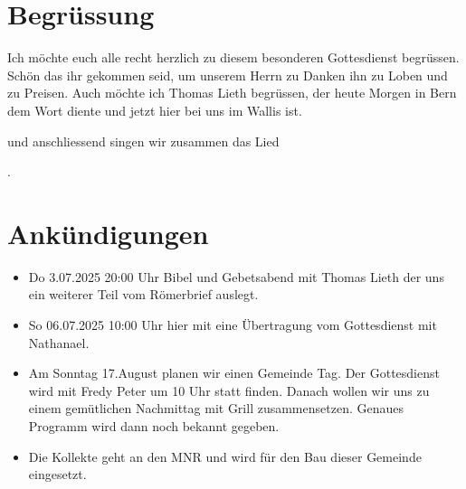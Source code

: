 \documentclass{../../inc/mybib}
\begin{document}
\section{Begrüssung}

Ich möchte euch alle recht herzlich zu diesem besonderen Gottesdienst begrüssen. Schön das ihr gekommen seid, um unserem Herrn zu Danken ihn zu Loben und zu Preisen.
Auch möchte ich Thomas Lieth begrüssen, der heute Morgen in Bern dem Wort diente und jetzt hier bei uns im Wallis ist. 

\beten{} und anschliessend singen wir zusammen das Lied

{}.

\section{Ankündigungen}
\begin{itemize}
    \item {} Do 3.07.2025 20:00 Uhr Bibel und Gebetsabend mit Thomas Lieth  der uns ein weiterer Teil vom Römerbrief auslegt.
    \item {} So 06.07.2025 10:00 Uhr hier mit eine Übertragung vom Gottesdienst mit Nathanael.
    \item {} Am Sonntag 17.August planen wir einen Gemeinde Tag. Der Gottesdienst wird mit Fredy Peter um 10 Uhr statt finden. Danach wollen wir uns zu einem gemütlichen Nachmittag mit Grill zusammensetzen. Genaues Programm wird dann noch bekannt gegeben.
    \item {} Die Kollekte geht an den MNR und wird für den Bau dieser Gemeinde eingesetzt.
\end{itemize}
\end{document}
